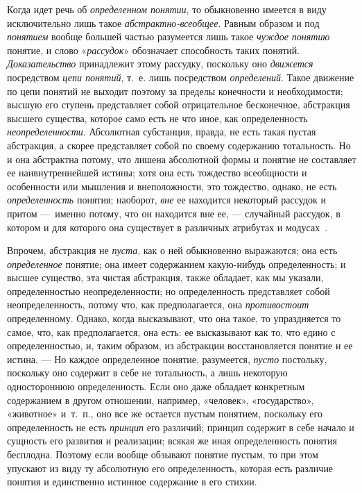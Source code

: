\documentclass[twoside]{article}
\begin{document}
{{Когда идет речь об
{\em определенном понятии},
то обыкновенно имеется в виду исключительно лишь такое
{\em абстрактно-всеобщее}.
Равным образом и под
{\em понятием} вообще
большей частью разумеется лишь такое
{\em чуждое понятию}
понятие, и слово
«{\em рассудок}»
обозначает способность таких понятий.
{\em Доказательство}
принадлежит этому рассудку, поскольку оно
{\em движется}
посредством {\em цепи
понятий}, т.~е. лишь посредством
{\em определений}. Такое
движение по цепи понятий не выходит поэтому за пределы конечности и
необходимости; высшую его ступень представляет собой отрицательное
бесконечное, абстракция высшего существа, которое само есть не что иное,
как определенность
{\em неопределенности}.
Абсолютная субстанция, правда, не есть такая пустая
абстракция, а скорее представляет собой по своему содержанию тотальность.
Но и она абстрактна потому, что лишена абсолютной формы и понятие не
составляет ее наивнутреннейшей истины; хотя она есть тождество всеобщности
и особенности или мышления и внеположности, это тождество,
однако, не есть {\em определенность}
понятия; наоборот,
{\em вне} ее находится
некоторый рассудок и притом —~именно потому, что он
находится вне ее, — случайный рассудок, в котором и для
которого она существует в различных атрибутах и
модусах~\label{bkm:bm18}.

Впрочем, абстракция не
{\em пуста}, как о ней
обыкновенно выражаются; она есть
{\em определенное}
понятие; она имеет содержанием какую-нибудь определенность; и
высшее существо, эта чистая абстракция, также обладает, как мы указали,
определенностью неопределенности; но определенность представляет собой
неопределенность, потому что, как предполагается, она
{\em противостоит}
определенному. Однако, когда высказывают, что она такое, то
упраздняется то самое, что, как предполагается, она есть: ее высказывают
как то, что едино с определенностью, и, таким образом, из абстракции
восстановляется понятие и ее истина. — Но каждое
определенное понятие, разумеется,
{\em пусто} постольку,
поскольку оно содержит в себе не тотальность, а лишь некоторую
одностороннюю определенность. Если оно даже обладает конкретным содержанием
в другом отношении, например, «человек», «государство», «животное» и~т.~п.,
оно все же остается пустым понятием, поскольку его определенность не есть
{\em принцип} его
различий; принцип содержит в себе начало и сущность его развития и
реализации; всякая же иная определенность понятия бесплодна. Поэтому если
вообще обзывают понятие пустым, то при этом упускают из виду ту абсолютную
его определенность, которая есть различие понятия и единственно истинное
содержание в его стихии.

}}
\end{document}
